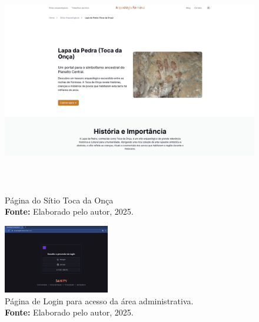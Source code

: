 \begin{figure}[H]
    \centering
    \includegraphics[height=10cm, keepaspectratio]{img/site/pagina_toca_da_onca.png}
    \caption{Página do Sítio Toca da Onça \\
    \textbf{Fonte:} Elaborado pelo autor, 2025.}
    \label{fig:pagina_tocadaonca}
\end{figure}

\begin{figure}[H]
    \centering
    \includegraphics[height=3cm, keepaspectratio]{img/site/login.png}
    \caption{Página de Login para acesso da área administrativa. \\
    \textbf{Fonte:} Elaborado pelo autor, 2025.}
    \label{fig:footer}
\end{figure}

